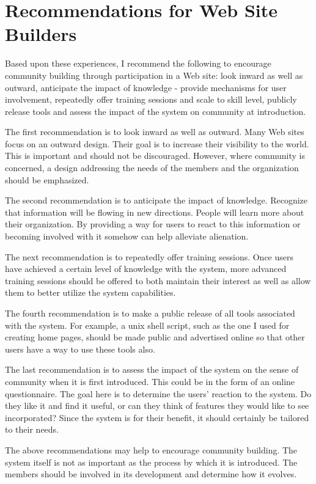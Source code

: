 \section{Recommendations for Web Site Builders}
Based upon these experiences, I recommend the following to encourage community
building through participation in a Web site: look inward as well as outward,
anticipate the impact of knowledge - provide mechanisms for user involvement,
repeatedly offer training sessions and scale to skill level, publicly release
tools and assess the impact of the system on community at introduction.

The first recommendation is to look inward as well as outward.  Many Web sites
focus on an outward design.  Their goal is to increase their visibility to the
world.  This is important and should not be discouraged.  However, where
community is concerned, a design addressing the needs of the members and the
organization should be emphasized.

The second recommendation is to anticipate the impact of knowledge.  Recognize
that information will be flowing in new directions.  People will learn more
about their organization.  By providing a way for users to react to this
information or becoming involved with it somehow can help alleviate alienation.

The next recommendation is to repeatedly offer training sessions.  Once users
have achieved a certain level of knowledge with the system, more advanced
training sessions should be offered to both maintain their interest as well as
allow them to better utilize the system capabilities.

The fourth recommendation is to make a public release of all tools associated
with the system.  For example, a unix shell script, such as the one I used for
creating home pages, should be made public and advertised online so that other
users have a way to use these tools also.

The last recommendation is to assess the impact of the system on the sense of
community when it is first introduced.  This could be in the form of an online
questionnaire.  The goal here is to determine the users' reaction to the
system.  Do they like it and find it useful, or can they think of features they
would like to see incorporated?  Since the system is for their benefit, it
should certainly be tailored to their needs.

The above recommendations may help to encourage community building.  The system
itself is not as important as the process by which it is introduced.  The
members should be involved in its development and determine how it evolves.


